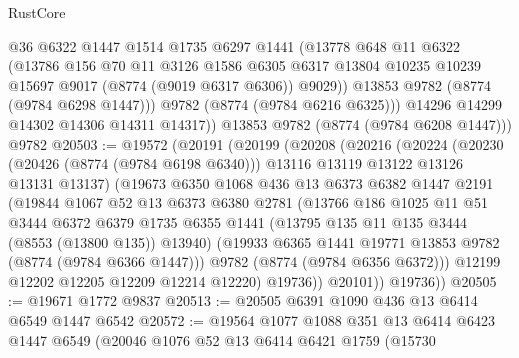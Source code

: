 \begin{lexlean}{RustCore}
\begin{coremodule}
              @36
              @6322
              @1447
              @1514
              @1735
              @6297
              @1441
              (@13778
                @648
                @11
                @6322
                (@13786
                  @156
                  @70
                  @11
                  @3126
                  @1586
                  @6305
                  @6317
                  @13804
                  @10235
                  @10239
                  @15697
                  @9017
                  (@8774 (@9019 @6317 @6306))
                  @9029))
              @13853
              @9782
              (@8774 (@9784 @6298 @1447)))
            @9782
            (@8774 (@9784 @6216 @6325)))
          @14296
          @14299
          @14302
          @14306
          @14311
          @14317))
      @13853
      @9782
      (@8774 (@9784 @6208 @1447)))
    @9782
@20503 := @19572
    (@20191
      (@20199
        (@20208
          (@20216
            (@20224
              (@20230
                (@20426 (@8774 (@9784 @6198 @6340)))
                @13116
                @13119
                @13122
                @13126
                @13131
                @13137)
              (@19673
                @6350
                @1068
                @436
                @13
                @6373
                @6382
                @1447
                @2191
                (@19844
                  @1067
                  @52
                  @13
                  @6373
                  @6380
                  @2781
                  (@13766
                    @186
                    @1025
                    @11
                    @51
                    @3444
                    @6372
                    @6379
                    @1735
                    @6355
                    @1441
                    (@13795 @135 @11 @135 @3444 (@8553 (@13800 @135)) @13940)
                    (@19933 @6365 @1441 @19771 @13853 @9782 (@8774 (@9784 @6366 @1447)))
                    @9782
                    (@8774 (@9784 @6356 @6372)))
                  @12199
                  @12202
                  @12205
                  @12209
                  @12214
                  @12220)
                @19736))
            @20101))
        @19736))
@20505 := @19671 @1772 @9837
@20513 := @20505 @6391 @1090 @436 @13 @6414 @6549 @1447 @6542
@20572 := @19564
    @1077
    @1088
    @351
    @13
    @6414
    @6423
    @1447
    @6549
    (@20046
      @1076
      @52
      @13
      @6414
      @6421
      @1759
      (@15730

\end{coremodule}
\end{lexlean}
